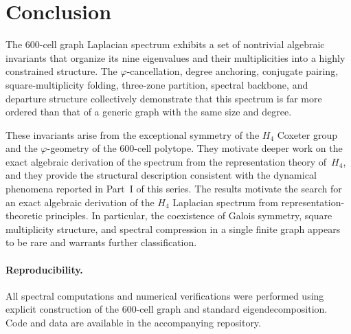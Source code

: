 \documentclass[12pt,a4paper]{article}
\newcommand{\Hfour}{H_4}
\newcommand{\vphi}{\varphi}
\begin{document}
\section{Conclusion}\label{sec:conclusion}

The 600-cell graph Laplacian spectrum exhibits a set of nontrivial
algebraic invariants that organize its nine eigenvalues and their
multiplicities into a highly constrained structure.  The
$\vphi$-cancellation, degree anchoring, conjugate pairing,
square-multiplicity folding, three-zone partition, spectral backbone,
and departure structure collectively demonstrate that this spectrum is
far more ordered than that of a generic graph with the same size and
degree.

These invariants arise from the exceptional symmetry of the $\Hfour$
Coxeter group and the $\vphi$-geometry of the 600-cell polytope.  They
motivate deeper work on the exact algebraic derivation of the spectrum
from the representation theory of~$\Hfour$, and they provide the
structural description consistent with the dynamical phenomena
reported in Part~I of this series.  The results motivate the search for
an exact algebraic derivation of the $\Hfour$ Laplacian spectrum from
representation-theoretic principles.  In particular, the coexistence of
Galois symmetry, square multiplicity structure, and spectral compression
in a single finite graph appears to be rare and warrants further
classification.

\paragraph{Reproducibility.}
All spectral computations and numerical verifications were performed
using explicit construction of the 600-cell graph and standard
eigendecomposition.  Code and data are available in the accompanying
repository.
\end{document}
